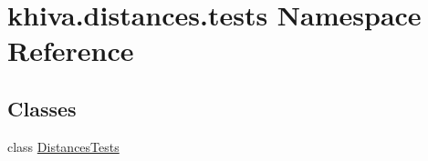 \hypertarget{namespacekhiva_1_1distances_1_1tests}{}\section{khiva.\+distances.\+tests Namespace Reference}
\label{namespacekhiva_1_1distances_1_1tests}
\subsection*{Classes}
\begin{DoxyCompactItemize}
\item 
class \mbox{\hyperlink{classkhiva_1_1distances_1_1tests_1_1_distances_tests}{Distances\+Tests}}
\end{DoxyCompactItemize}

